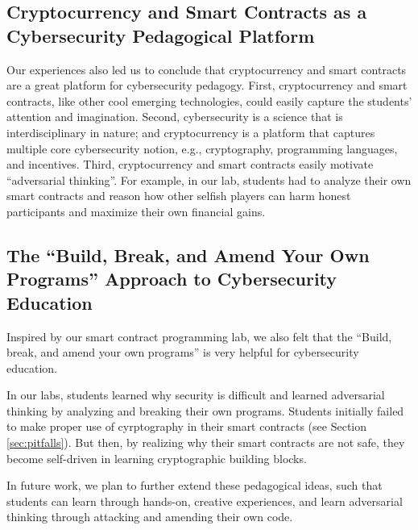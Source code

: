 \documentclass[10pt,twocolumn,letterpaper]{article}
\newcommand{\ignore}[1]{}
\begin{document}
\subsection{Cryptocurrency and Smart Contracts as 
a Cybersecurity Pedagogical Platform}
Our experiences also led us to conclude 
that cryptocurrency and smart contracts are a
great platform for cybersecurity pedagogy. 
First, cryptocurrency and smart contracts, like
other cool emerging technologies, could easily capture the students'
attention and imagination.
Second, 
cybersecurity is a science that is interdisciplinary in nature;
and cryptocurrency is a platform that captures 
multiple core cybersecurity notion, e.g., cryptography, 
programming languages, and incentives. 
Third, cryptocurrency and smart contracts
easily motivate ``adversarial thinking''. For example,
in our lab, students had to analyze their own smart contracts
and reason how other selfish players can harm 
honest participants and maximize their own financial gains.

\ignore{
in our lab, students were able to compose smart contracts,
and then conduct in-depth security analyses of their own smart contracts.
In this process, students learned the 
essense of ``adversarial thinking'', e.g., by reasoning how
selfish participants in a smart contract 
can maximize its financial gains and harm honest players. 
}


\subsection{The ``Build, Break, and Amend Your Own Programs''
Approach to Cybersecurity Education}
Inspired by our smart contract programming lab, 
we also felt that the 
``Build, break, and amend your own programs''
is very helpful for cybersecurity education. 

In our labs, students learned why security is difficult 
and learned adversarial thinking
by analyzing and breaking 
their own programs.  
Students initially  
failed to make proper use of cyrptography in their 
smart contracts (see Section \ref{sec:pitfalls}).
But then, by realizing
why their smart contracts are not safe, they 
become self-driven in learning cryptographic building blocks.

In future work, we plan to further extend these pedagogical ideas, 
such that students can learn through hands-on, 
creative experiences, and learn adversarial thinking 
through attacking and amending their own code.
\end{document}
